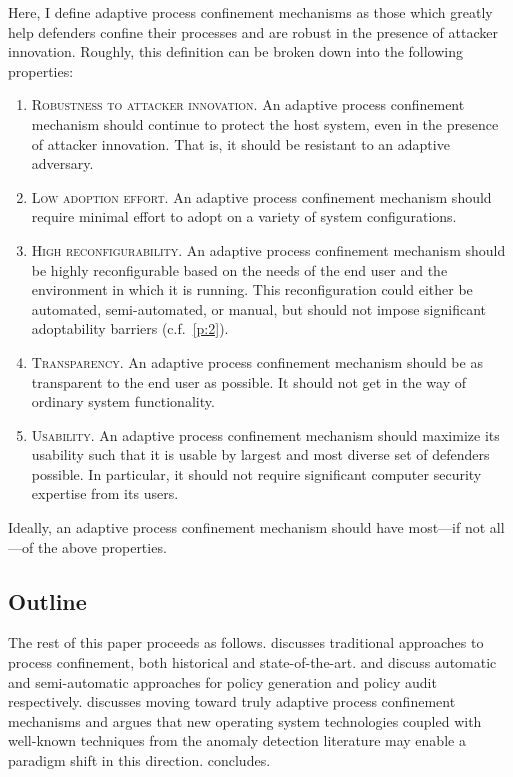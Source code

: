 \documentclass[dvipsnames, 12pt]{article}
\begin{document}
Here, I define adaptive process confinement mechanisms as those which greatly
help defenders confine their processes and are robust in the presence of
attacker innovation. Roughly, this definition can be broken down into the
following properties:
\begin{enumerate}[label=\bfseries P\arabic*., ref=P\arabic*, labelindent=2em]
    \item \label{p:1} \textsc{Robustness to attacker innovation.} An adaptive
    process confinement mechanism should continue to protect the host system,
    even in the presence of attacker innovation. That is, it should be resistant
    to an adaptive adversary.

    \item \label{p:2} \textsc{Low adoption effort.} An adaptive process
    confinement mechanism should require minimal effort to adopt on a variety of
    system configurations.

    \item \label{p:3} \textsc{High reconfigurability.} An adaptive process
    confinement mechanism should be highly reconfigurable based on the needs of
    the end user and the environment in which it is running. This
    reconfiguration could either be automated, semi-automated, or manual, but
    should not impose significant adoptability barriers (c.f.~\ref{p:2}).

    \item \label{p:4} \textsc{Transparency.} An adaptive process confinement
    mechanism should be as transparent to the end user as possible. It should
    not get in the way of ordinary system functionality.

    \item \label{p:5} \textsc{Usability.} An adaptive process confinement
    mechanism should maximize its usability such that it is usable by largest
    and most diverse set of defenders possible. In particular, it should not
    require significant computer security expertise from its users.
\end{enumerate}
Ideally, an adaptive process confinement mechanism should have most---if not
all---of the above properties.

\subsection{Outline}

The rest of this paper proceeds as follows.  discusses
traditional approaches to process confinement, both historical and
state-of-the-art.  and
 discuss automatic and semi-automatic approaches for
policy generation and policy audit respectively.  discusses
moving toward truly adaptive process confinement mechanisms and argues that new
operating system technologies coupled with well-known techniques from the
anomaly detection literature may enable a paradigm shift in this direction.
 concludes.
\end{document}
